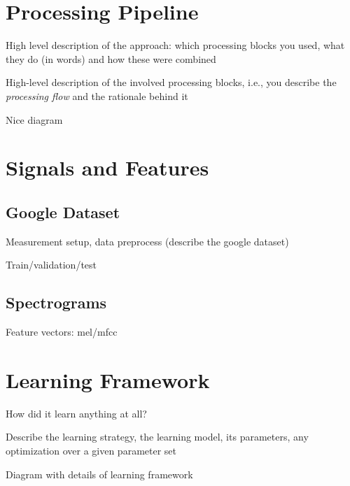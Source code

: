 
\section{Processing Pipeline}
\label{sec:processing_architecture}

High level description of the approach: which processing blocks you used, what they do (in words) and how these were combined

High-level description of the involved processing blocks, i.e., you describe the {\it processing flow} and the rationale behind it

Nice diagram

\section{Signals and Features}
\label{sec:model}

\subsection{Google Dataset}

Measurement setup, data preprocess (describe the google dataset)

Train/validation/test

\subsection{Spectrograms}

Feature vectors: mel/mfcc

\section{Learning Framework}
\label{sec:learning_framework}

How did it learn anything at all?

Describe the learning strategy, the learning model, its parameters, any optimization over a given parameter set

Diagram with details of learning framework
